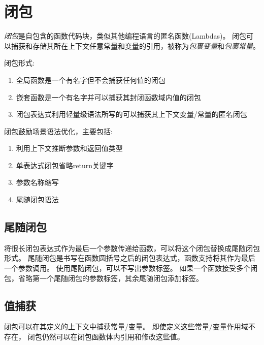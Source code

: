 \documentclass{../main.tex}{subfiles}
\begin{document}
\section{闭包}
\emph{闭包}是自包含的函数代码块，类似其他编程语言的匿名函数(Lambdas)。
闭包可以捕获和存储其所在上下文任意常量和变量的引用，被称为\emph{包裹变量}和\emph{包裹常量}。

闭包形式:
\begin{enumerate}[itemsep=0pt, parsep=0pt, topsep=0pt, partopsep=0pt]
    \item 全局函数是一个有名字但不会捕获任何值的闭包
    \item 嵌套函数是一个有名字并可以捕获其封闭函数域内值的闭包
    \item 闭包表达式利用轻量级语法所写的可以捕获其上下文变量/常量的匿名闭包
\end{enumerate}
闭包鼓励场景语法优化，主要包括:
\begin{enumerate}[itemsep=0pt, parsep=0pt, topsep=0pt, partopsep=0pt]
    \item 利用上下文推断参数和返回值类型
    \item 单表达式闭包省略return关键字
    \item 参数名称缩写
    \item 尾随闭包语法
\end{enumerate}

\subsection{尾随闭包}
将很长闭包表达式作为最后一个参数传递给函数，可以将这个闭包替换成尾随闭包形式。
尾随闭包是书写在函数圆括号之后的闭包表达式，函数支持将其作为最后一个参数调用。
使用尾随闭包，可以不写出参数标签。
如果一个函数接受多个闭包，省略第一个尾随闭包的参数标签，其余尾随闭包添加标签。




\subsection{值捕获}
闭包可以在其定义的上下文中捕获常量/变量。
即使定义这些常量/变量作用域不存在，
    闭包仍然可以在闭包函数体内引用和修改这些值。
\end{document}
